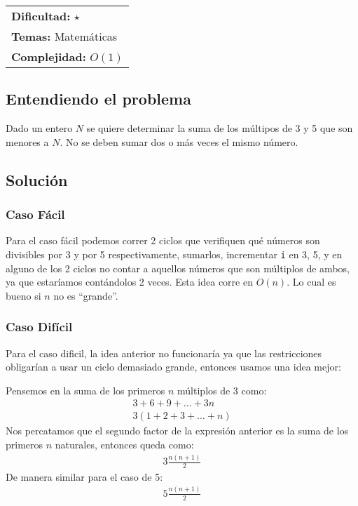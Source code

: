 \hfill
\begin{tabular}{@{}l@{}}
\textbf{Dificultad:} $\star$ \\
\textbf{Temas:} Matemáticas \\
\textbf{Complejidad:} $O(1)$
\end{tabular}

\subsection*{Entendiendo el problema}
Dado un entero $N$ se quiere determinar la suma de los múltipos de 3 y 5 que son menores a $N$. No se deben sumar dos o más veces el mismo número.

\subsection*{Solución}

\subsubsection*{Caso Fácil}

Para el caso fácil podemos correr 2 ciclos que verifiquen qué números son divisibles por 3 y por 5 respectivamente, sumarlos, incrementar \texttt{i} en 3, 5, y en alguno de los 2 ciclos no contar a aquellos números que son múltiplos de ambos, ya que estaríamos contándolos 2 veces. Esta idea corre en $O(n)$. Lo cual es bueno si $n$ no es ``grande''.

\subsubsection*{Caso Difícil}

Para el caso dificil, la idea anterior no funcionaría ya que las restricciones obligarían a usar un ciclo demasiado grande, entonces usamos una idea mejor:

Pensemos en la suma de los primeros $n$ múltiplos de 3 como:
\begin{eqnarray*}
3 + 6 + 9 + \hdots + 3n\\
3 (1 + 2 + 3 + \hdots +n)
\end{eqnarray*}
Nos percatamos que el segundo factor de la expresión anterior es la suma de los primeros $n$ naturales, entonces queda como:
\begin{eqnarray*}
3 \frac{n(n+1)}{2}
\end{eqnarray*}
De manera similar para el caso de 5:
\begin{eqnarray*}
5 \frac{n(n+1)}{2}
\end{eqnarray*}

